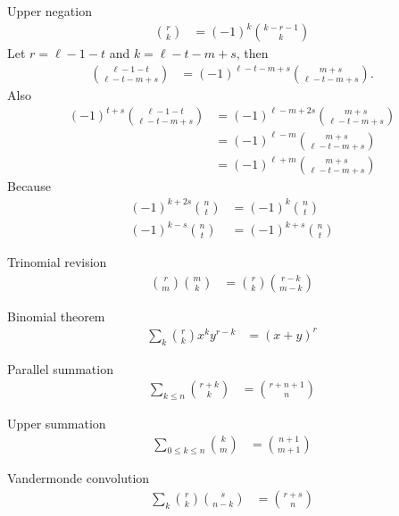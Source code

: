 \begin{identity}
    Upper negation
    \begin{align*}
        \binom{r}{k} &= (-1)^k \binom{k - r - 1}{k}
    \end{align*}
    Let $r=\ell-1-t$ and $k=\ell-t-m+s$, then
    \begin{align*}
        \binom{\ell-1-t}{\ell-t-m+s} &= (-1)^{\ell-t-m+s} \binom{m+s}{\ell-t-m+s}.
    \end{align*}
    Also
    \begin{align*}
    (-1)
        ^{t+s} \binom{\ell-1-t}{\ell-t-m+s}
        &= (-1)^{\ell-m+2s} \binom{m+s}{\ell-t-m+s} \\
        &= (-1)^{\ell-m} \binom{m+s}{\ell-t-m+s} \\
        &= (-1)^{\ell+m} \binom{m+s}{\ell-t-m+s}
    \end{align*}
    Because
    \begin{align*}
    (-1)
        ^{k+2s} \binom{n}{t} &= (-1)^k \binom{n}{t} \\
        (-1)^{k-s} \binom{n}{t}  &= (-1)^{k+s} \binom{n}{t}
    \end{align*}
\end{identity}

\begin{identity}
    Trinomial revision
    \begin{align*}
        \binom{r}{m} \binom{m}{k} &= \binom{r}{k} \binom{r - k}{m - k}
    \end{align*}
\end{identity}

\begin{identity}
    Binomial theorem
    \begin{align*}
        \sum_{k} \binom{r}{k} x^k y^{r-k} &= (x + y)^r
    \end{align*}
\end{identity}

\begin{identity}
    Parallel summation
    \begin{align*}
        \sum_{k \leq n} \binom{r + k}{k} &= \binom{r + n + 1}{n}
    \end{align*}
\end{identity}

\begin{identity}
    Upper summation
    \begin{align*}
        \sum_{0 \leq k \leq n} \binom{k}{m} &= \binom{n + 1}{m + 1}
    \end{align*}
\end{identity}

\begin{identity}
    Vandermonde convolution
    \begin{align*}
        \sum_{k} \binom{r}{k} \binom{s}{n-k} &= \binom{r + s}{n}
    \end{align*}
\end{identity}









\clearpage
